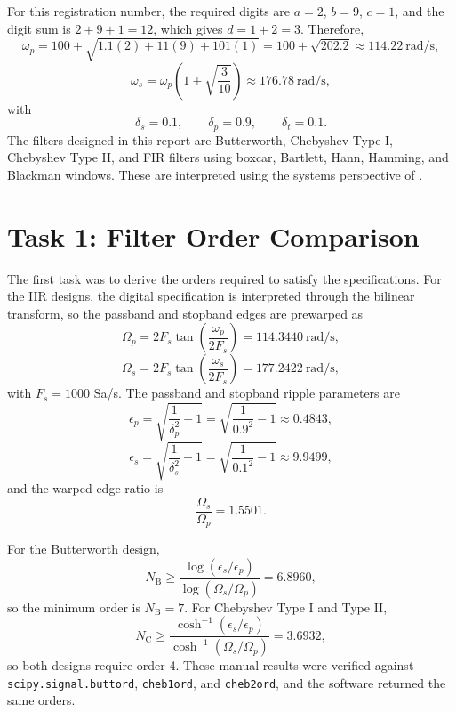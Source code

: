 \documentclass[12pt, a4paper]{article}
\begin{document}
For this registration number, the required digits are $a=2$, $b=9$, $c=1$, and the digit sum is $2+9+1=12$, which gives $d=1+2=3$. Therefore,
\begin{equation}
\omega_p = 100 + \sqrt{1.1(2) + 11(9) + 101(1)} = 100 + \sqrt{202.2} \approx 114.22\ \text{rad/s},
\end{equation}
\begin{equation}
\omega_s = \omega_p \left(1 + \sqrt{\frac{3}{10}}\right) \approx 176.78\ \text{rad/s},
\end{equation}
with
\begin{equation}
\delta_s = 0.1, \qquad \delta_p = 0.9, \qquad \delta_t = 0.1.
\end{equation}
The filters designed in this report are Butterworth, Chebyshev Type I, Chebyshev Type II, and FIR filters using boxcar, Bartlett, Hann, Hamming, and Blackman windows. These are interpreted using the systems perspective of \cite{oppenheim2010, proakis2007, mitra2011, oppenheim1997}.

\section{Task 1: Filter Order Comparison}
The first task was to derive the orders required to satisfy the specifications. For the IIR designs, the digital specification is interpreted through the bilinear transform, so the passband and stopband edges are prewarped as
\begin{equation}
\Omega_p = 2F_s \tan\left(\frac{\omega_p}{2F_s}\right) = 114.3440\ \text{rad/s},
\end{equation}
\begin{equation}
\Omega_s = 2F_s \tan\left(\frac{\omega_s}{2F_s}\right) = 177.2422\ \text{rad/s},
\end{equation}
with $F_s = 1000$ Sa/s. The passband and stopband ripple parameters are
\begin{equation}
\epsilon_p = \sqrt{\frac{1}{\delta_p^2} - 1} = \sqrt{\frac{1}{0.9^2} - 1} \approx 0.4843,
\end{equation}
\begin{equation}
\epsilon_s = \sqrt{\frac{1}{\delta_s^2} - 1} = \sqrt{\frac{1}{0.1^2} - 1} \approx 9.9499,
\end{equation}
and the warped edge ratio is
\begin{equation}
\frac{\Omega_s}{\Omega_p} = 1.5501.
\end{equation}

For the Butterworth design,
\begin{equation}
N_{\mathrm{B}} \ge \frac{\log(\epsilon_s / \epsilon_p)}{\log(\Omega_s / \Omega_p)} = 6.8960,
\end{equation}
so the minimum order is $N_{\mathrm{B}} = 7$. For Chebyshev Type I and Type II,
\begin{equation}
N_{\mathrm{C}} \ge \frac{\cosh^{-1}(\epsilon_s / \epsilon_p)}{\cosh^{-1}(\Omega_s / \Omega_p)} = 3.6932,
\end{equation}
so both designs require order 4. These manual results were verified against \texttt{scipy.signal.buttord}, \texttt{cheb1ord}, and \texttt{cheb2ord}, and the software returned the same orders.
\end{document}
